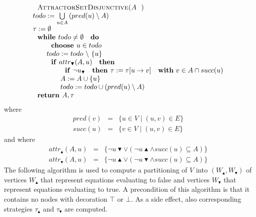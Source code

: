 \begin{equation*}
\begin{array}{l}
\text{\textsc{AttractorSetDisjunctive(}}A\text{\textsc{)}} \\ 
todo:=\bigcup\limits_{u\in A}\left( pred(u)\setminus A\right)  \\ 
\tau :=\emptyset  \\ 
\text{\textbf{while }}todo\neq \emptyset \text{ \textbf{do}} \\ 
\qquad \text{\textbf{choose }}u\in todo \\ 
\qquad todo:=todo\ \backslash \ \{u\} \\ 
\qquad \text{\textbf{if} }attr_{\blacktriangledown }(A,u)\text{ \textbf{then}%
} \\ 
\qquad \qquad \text{\textbf{if} }\lnot u_{\blacktriangledown }\text{ \textbf{%
then }}\tau :=\tau \lbrack u\rightarrow v]\text{ \textbf{with} }v\in A\cap
succ(u) \\ 
\qquad \qquad A:=A\cup \{u\} \\ 
\qquad \qquad todo:=todo\cup \left( pred(u)\setminus A\right)  \\ 
\text{\textbf{return }}A,\tau 
\end{array}%
\end{equation*}%
where%
\begin{eqnarray*}
pred(v) &=&\{u\in V\mid (u,v)\in E\} \\
succ(u) &=&\{v\in V\mid (u,v)\in E\}
\end{eqnarray*}%
and where%
\begin{eqnarray*}
attr_{\blacktriangle }(A,u) &=&\{\lnot u\blacktriangledown \vee \left( \lnot
u\blacktriangle \wedge succ(u)\subseteq A\right) \} \\
attr_{\blacktriangledown }(A,u) &=&\{\lnot u\blacktriangle \vee \left( \lnot
u\blacktriangledown \wedge succ(u)\subseteq A\right) \}
\end{eqnarray*}%
The following algorithm is used to compute a partitioning of $V$ into $%
\left( W_{\blacktriangle },W_{\blacktriangledown }\right) $ of vertices $%
W_{\blacktriangle }$ that represent equations evaluating to false and
vertices $W_{\blacktriangledown }$ that represent equations evaluating to
true. A precondition of this algorithm is that it contains no nodes with
decoration $\top $ or $\bot $. As a side effect, also corresponding
strategies $\tau _{\blacktriangle }$ and $\tau _{\blacktriangledown }$ are
computed.%
